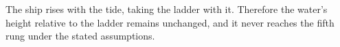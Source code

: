 The ship rises with the tide, taking the ladder with it. Therefore the water's height relative to the ladder remains unchanged, and it never reaches the fifth rung under the stated assumptions.
